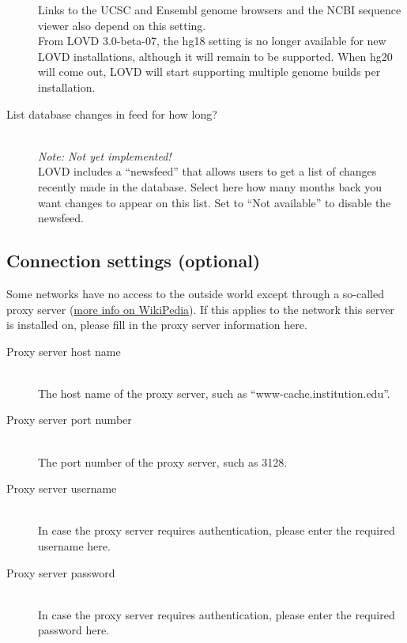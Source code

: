 \documentclass[a4paper,oneside,openany,12pt]{memoir}
\begin{document}
\begin{description}
  Links to the UCSC and Ensembl genome browsers and the NCBI sequence viewer also depend on this setting.
  \\
  From LOVD 3.0-beta-07, the hg18 setting is no longer available for new LOVD installations, although it will remain to be supported.
  When hg20 will come out, LOVD will start supporting multiple genome builds per installation.
  \item[List database changes in feed for how long?] \hfill \\
  \emph{Note: Not yet implemented!}
  \\
  LOVD includes a ``newsfeed'' that allows users to get a list of changes recently made in the database.
  Select here how many months back you want changes to appear on this list.
  Set to ``Not available'' to disable the newsfeed.
\end{description}



\subsection{Connection settings (optional)}
Some networks have no access to the outside world except through a so-called proxy server (\href{http://en.wikipedia.org/wiki/Proxy_server#Forward_proxies}{more info on WikiPedia}).
If this applies to the network this server is installed on, please fill in the proxy server information here.
\begin{description}
  \item[Proxy server host name] \hfill \\
  The host name of the proxy server, such as ``www-cache.institution.edu''.
  \item[Proxy server port number] \hfill \\
  The port number of the proxy server, such as 3128.
  \item[Proxy server username] \hfill \\
  In case the proxy server requires authentication, please enter the required username here.
  \item[Proxy server password] \hfill \\
  In case the proxy server requires authentication, please enter the required password here.
\end{description}



\pagebreak[4] %
\end{document}
